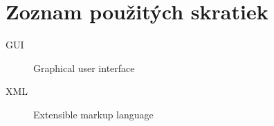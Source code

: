 \chapter{Zoznam použitých skratiek}

\begin{description}
	\item[GUI] Graphical user interface
	\item[XML] Extensible markup language
\end{description}
